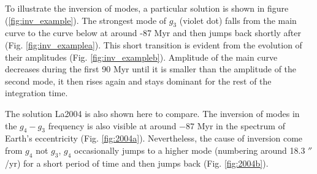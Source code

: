 \documentclass[12pt]{article}
\begin{document}
	To illustrate the inversion of modes, a particular solution is shown in figure (\ref{fig:inv_example}). The strongest mode of $g_3$ (violet dot) falls from the main curve to the curve below at around -87 Myr and then jumps back shortly after (Fig. \ref{fig:inv_examplea}). This short transition is evident from the evolution of their amplitudes (Fig. \ref{fig:inv_exampleb}). Amplitude of the main curve decreases during the first 90 Myr until it is smaller than the amplitude of the second mode, it then rises again and stays dominant for the rest of the integration time.
	
	The solution La2004 is also shown here to compare. The inversion of modes in the $g_4 - g_3 $ frequency is also visible at around $-87$ Myr in the spectrum of Earth's eccentricity (Fig. \ref{fig:2004a}). Nevertheless, the cause of inversion come from $g_4$ not $g_3$, $g_4$ occasionally jumps to a higher mode (numbering around 18.3 $''$/yr) for a short period of time and then jumps back (Fig. \ref{fig:2004b}).
	
\end{document}
